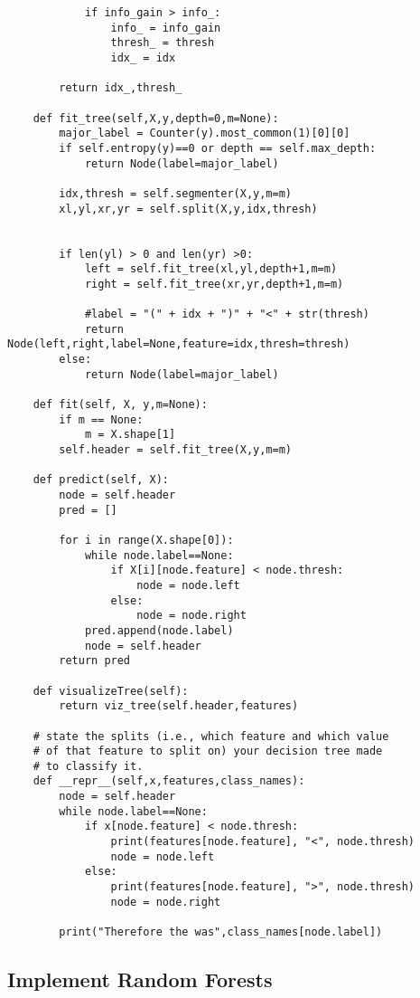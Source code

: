 \documentclass[a4paper,12pt]{article}
\begin{document}
\begin{lstlisting}
            if info_gain > info_:
                info_ = info_gain
                thresh_ = thresh
                idx_ = idx

        return idx_,thresh_
    
    def fit_tree(self,X,y,depth=0,m=None):
        major_label = Counter(y).most_common(1)[0][0]
        if self.entropy(y)==0 or depth == self.max_depth:
            return Node(label=major_label)
        
        idx,thresh = self.segmenter(X,y,m=m)
        xl,yl,xr,yr = self.split(X,y,idx,thresh)
        
        
        if len(yl) > 0 and len(yr) >0:
            left = self.fit_tree(xl,yl,depth+1,m=m)
            right = self.fit_tree(xr,yr,depth+1,m=m)
                
            #label = "(" + idx + ")" + "<" + str(thresh)
            return Node(left,right,label=None,feature=idx,thresh=thresh)
        else:
            return Node(label=major_label)
    
    def fit(self, X, y,m=None):
        if m == None:
            m = X.shape[1]
        self.header = self.fit_tree(X,y,m=m)

    def predict(self, X):
        node = self.header
        pred = []
        
        for i in range(X.shape[0]):
            while node.label==None:
                if X[i][node.feature] < node.thresh:
                    node = node.left
                else:
                    node = node.right
            pred.append(node.label)
            node = self.header
        return pred
    
    def visualizeTree(self):
        return viz_tree(self.header,features)
        
    # state the splits (i.e., which feature and which value 
    # of that feature to split on) your decision tree made 
    # to classify it.
    def __repr__(self,x,features,class_names):
        node = self.header
        while node.label==None:
            if x[node.feature] < node.thresh:
                print(features[node.feature], "<", node.thresh)
                node = node.left
            else:
                print(features[node.feature], ">", node.thresh)
                node = node.right

        print("Therefore the was",class_names[node.label])
\end{lstlisting}

\clearpage

\subsection{Implement Random Forests}
\end{document}
